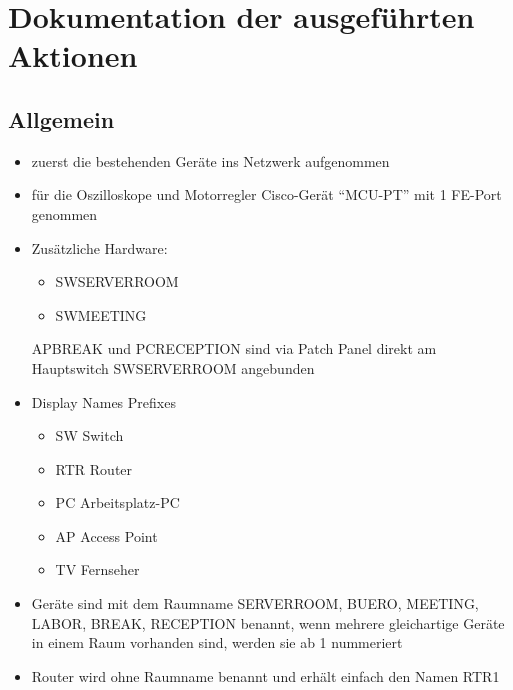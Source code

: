 \documentclass[11pt]{article}
\begin{document}
\section{Dokumentation der ausgeführten Aktionen}
\label{sec:org859bd62}
\subsection{Allgemein}
\label{sec:orgae8e6a0}
\begin{itemize}
\item zuerst die bestehenden Geräte ins Netzwerk aufgenommen
\item für die Oszilloskope und Motorregler Cisco-Gerät ``MCU-PT'' mit 1 FE-Port genommen
\item Zusätzliche Hardware:
\begin{itemize}
\item SWSERVERROOM
\item SWMEETING
\end{itemize}
APBREAK und PCRECEPTION sind via Patch Panel direkt am Hauptswitch SWSERVERROOM angebunden
\item Display Names Prefixes
\begin{itemize}
\item SW Switch
\item RTR Router
\item PC Arbeitsplatz-PC
\item AP Access Point
\item TV Fernseher
\end{itemize}
\item Geräte sind mit dem Raumname SERVERROOM, BUERO, MEETING, LABOR, BREAK, RECEPTION benannt, wenn mehrere gleichartige Geräte in einem Raum vorhanden sind, werden sie ab 1 nummeriert
\item Router wird ohne Raumname benannt und erhält einfach den Namen RTR1
\end{itemize}
\end{document}
